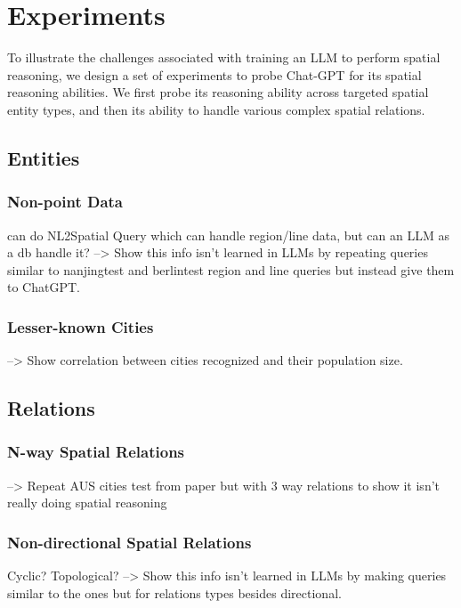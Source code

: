 \section{Experiments}
\label{section:experiments}

To illustrate the challenges associated with training an LLM to perform spatial reasoning, we design a set of experiments to probe Chat-GPT  for its spatial reasoning abilities.
We first probe its reasoning ability across targeted spatial entity types, and then its ability to handle various complex spatial relations.


\subsection{Entities} %

\subsubsection{Non-point Data}
\cite{Liu2023} can do NL2Spatial Query which can handle region/line data, but can an LLM as a db handle it?
--> Show this info isn't learned in LLMs by repeating queries similar to \cite{Liu2023} nanjingtest and berlintest region and line queries but instead give them to ChatGPT.

\subsubsection{Lesser-known Cities}
--> Show correlation between cities recognized and their population size.



\subsection{Relations} %

\subsubsection{N-way Spatial Relations}
--> Repeat AUS cities test from \cite{Qi2023} paper but with 3 way relations to show it isn't really doing spatial reasoning

\subsubsection{Non-directional Spatial Relations}
Cyclic? Topological?
--> Show this info isn't learned in LLMs by making queries similar to the \cite{Qi2023} ones but for relations types besides directional.

